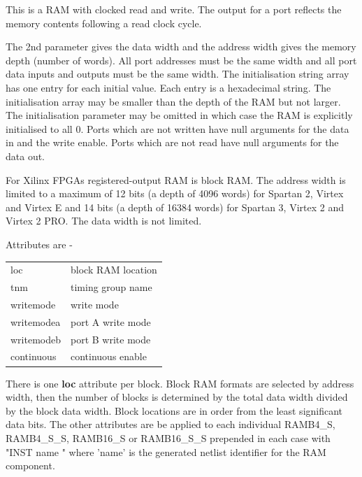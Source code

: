                 This is a RAM with clocked read and write. The output for a port
                reflects the memory contents following a read clock cycle.

                The 2nd parameter gives the data width and the address width
                gives the memory depth (number of words). All port addresses
                must be the same width and all port data inputs and outputs must
                be the same width. The initialisation string array has one entry
                for each initial value. Each entry is a hexadecimal string. The
                initialisation array may be smaller than the depth of the RAM
                but not larger. The initialisation parameter may be omitted in
                which case the RAM is explicitly initialised to all 0. Ports
                which are not written have null arguments for the data in and
                the write enable. Ports which are not read have null arguments
                for the data out.

                For Xilinx FPGAs registered-output RAM is block RAM. The address
                width is limited to a maximum of 12 bits (a depth of 4096 words)
                for Spartan 2, Virtex and  Virtex E and 14 bits (a depth of
                16384 words) for Spartan 3, Virtex 2 and Virtex 2 PRO. The data
                width is not limited.
                
                Attributes are -
                \begin{tabular}{| l | l |}
                \hline
                loc             & block RAM location \\
                tnm             & timing group name \\
                writemode       & write mode \\
                writemodea      & port A write mode \\
                writemodeb      & port B write mode \\
                continuous      & continuous enable \\           
                \hline
                \end{tabular}
                There is one {\bf loc} attribute per block. Block RAM formats
                are selected by address width, then the number of blocks is
                determined by the total data width divided by the block data width.
                Block locations are in order from the least significant data bits.
                The other attributes are be applied to each
                individual RAMB4\_S, RAMB4\_S\_S, RAMB16\_S or
                RAMB16\_S\_S prepended in each case with "INST name "
                where 'name' is the generated netlist identifier for the
                RAM component.

